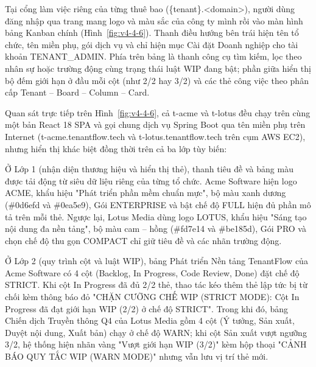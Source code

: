 
Tại cổng làm việc riêng của từng thuê bao (\{tenant\}.\textless domain\textgreater), người dùng đăng nhập qua trang mang logo và màu sắc của công ty mình rồi vào màn hình bảng Kanban chính (Hình~\ref{fig:v4-4-6}). Thanh điều hướng bên trái hiện tên tổ chức, tên miền phụ, gói dịch vụ và chỉ hiện mục Cài đặt Doanh nghiệp cho tài khoản TENANT\_\allowbreak{}ADMIN. Phía trên bảng là thanh công cụ tìm kiếm, lọc theo nhân sự hoặc trường động cùng trạng thái luật WIP đang bật; phần giữa hiển thị bộ đếm giới hạn ở đầu mỗi cột (như 2/2 hay 3/2) và các thẻ công việc theo phân cấp Tenant -- Board -- Column -- Card.


Quan sát trực tiếp trên Hình~\ref{fig:v4-4-6}, cả t-acme và t-lotus đều chạy trên cùng một bản React 18 SPA và gọi chung dịch vụ Spring Boot qua tên miền phụ trên Internet (t-acme.tenantflow.tech và t-lotus.tenantflow.tech trên cụm AWS EC2), nhưng hiển thị khác biệt đồng thời trên cả ba lớp tùy biến:

Ở Lớp 1 (nhận diện thương hiệu và hiển thị thẻ), thanh tiêu đề và bảng màu được tải động từ siêu dữ liệu riêng của từng tổ chức. Acme Software hiện logo ACME, khẩu hiệu "Phát triển phần mềm chuẩn mực", bộ màu xanh dương (\#0d6efd và \#0ea5e9), Gói ENTERPRISE và bật chế độ FULL hiện đủ phần mô tả trên mỗi thẻ. Ngược lại, Lotus Media dùng logo LOTUS, khẩu hiệu "Sáng tạo nội dung đa nền tảng", bộ màu cam -- hồng (\#fd7e14 và \#be185d), Gói PRO và chọn chế độ thu gọn COMPACT chỉ giữ tiêu đề và các nhãn trường động.

Ở Lớp 2 (quy trình cột và luật WIP), bảng Phát triển Nền tảng TenantFlow của Acme Software có 4 cột (Backlog, In Progress, Code Review, Done) đặt chế độ STRICT. Khi cột In Progress đã đủ 2/2 thẻ, thao tác kéo thêm thẻ lập tức bị từ chối kèm thông báo đỏ "CHẶN CƯỠNG CHẾ WIP (STRICT MODE): Cột \textquotesingle In Progress\textquotesingle{} đã đạt giới hạn WIP (2/2) ở chế độ STRICT". Trong khi đó, bảng Chiến dịch Truyền thông Q4 của Lotus Media gồm 4 cột (Ý tưởng, Sản xuất, Duyệt nội dung, Xuất bản) chạy ở chế độ WARN; khi cột Sản xuất vượt ngưỡng 3/2, hệ thống hiện nhãn vàng "Vượt giới hạn WIP (3/2)" kèm hộp thoại "CẢNH BÁO QUY TẮC WIP (WARN MODE)" nhưng vẫn lưu vị trí thẻ mới.

